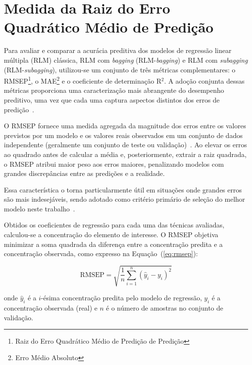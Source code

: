 
\section{Medida da Raiz do Erro Quadrático Médio de Predição}
\label{sec:mederropre}


Para avaliar e comparar a acurácia preditiva dos modelos de regressão 
linear múltipla (RLM) clássica, RLM com \textit{bagging} 
(RLM-\textit{bagging}) e RLM com \textit{subagging} 
(RLM-\textit{subagging}), utilizou-se um conjunto de três métricas 
complementares: o \gls{RMSEP}\footnote{Raiz do Erro Quadrático Médio de Predição de 
Predição}, o \gls{MAE}\footnote{Erro Médio Absoluto} e o coeficiente 
de determinação R$^2$. A adoção conjunta dessas métricas proporciona 
uma caracterização mais abrangente do desempenho preditivo, uma vez 
que cada uma captura aspectos distintos dos erros de 
predição~\cite{Westad2024,kumari2024}.

O \gls{RMSEP} fornece uma medida agregada da magnitude dos erros 
entre os valores previstos por um modelo e os valores reais 
observados em um conjunto de dados independente (geralmente um 
conjunto de teste ou validação)~\cite{Westad2024,kumari2024}. Ao 
elevar os erros ao quadrado antes de calcular a média e, 
posteriormente, extrair a raiz quadrada, o \gls{RMSEP} atribui 
maior peso aos erros maiores, penalizando modelos com grandes 
discrepâncias entre as predições e a realidade.

Essa característica 
o torna particularmente útil em situações onde grandes erros são 
mais indesejáveis, sendo adotado como critério primário de seleção 
do melhor modelo neste 
trabalho~\cite{liu2025,perisdiaz2021,jensen2024,Westad2024}.

Obtidos os coeficientes de regressão para cada uma das técnicas 
avaliadas, calculou-se a concentração do elemento de interesse. 
O \gls{RMSEP} objetiva minimizar a soma quadrada da diferença entre a concentração predita e a concentração observada, como expresso na Equação~(\ref{eq:rmsep}):

\begin{equation}
   \textrm{RMSEP} = \sqrt{\dfrac{1}{n}\sum_{i=1}^{n}(\widehat{y}_i-y_i)^2}
\label{eq:rmsep}
\end{equation}

\noindent onde $\widehat{y}_i$ é a $i$-ésima concentração predita 
pelo modelo de regressão, $y_i$ é a concentração observada (real) 
e $n$ é o número de amostras no conjunto de validação.

